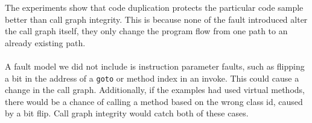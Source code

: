 The experiments show that code duplication protects the particular code sample better than call graph integrity. This is because none of the fault introduced alter the call graph itself, they only change the program flow from one path to an already existing path.\\\\
A fault model we did not include is instruction parameter faults, such as flipping a bit in the address of a \texttt{goto} or method index in an invoke. This could cause a change in the call graph. Additionally, if the examples had used virtual methods, there would be a chance of calling a method based on the wrong class id, caused by a bit flip. Call graph integrity would catch both of these cases.\\\\
